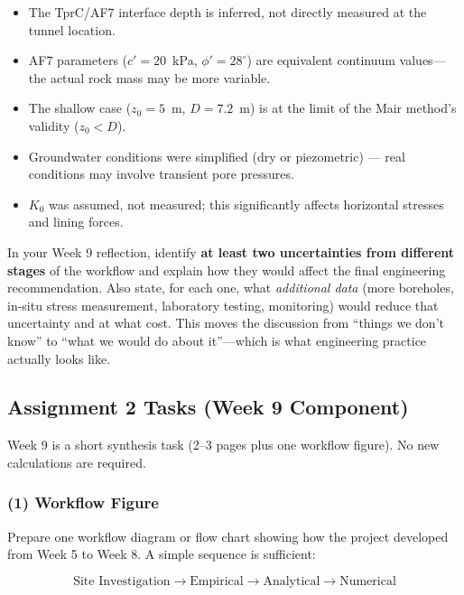 \documentclass[a4paper,12pt]{article}
\begin{document}
\begin{cautionbox}
\begin{itemize}[nosep]
    \item The TprC/AF7 interface depth is inferred, not directly measured at the tunnel location.
    \item AF7 parameters ($c'=20$~kPa, $\phi'=28^\circ$) are equivalent continuum values---the actual rock mass may be more variable.
    \item The shallow case ($z_0=5$~m, $D=7.2$~m) is at the limit of the Mair method's validity ($z_0 < D$).
    \item Groundwater conditions were simplified (dry or piezometric) --- real conditions may involve transient pore pressures.
    \item $K_0$ was assumed, not measured; this significantly affects horizontal stresses and lining forces.
\end{itemize}
\end{cautionbox}

\begin{warnbox}
In your Week 9 reflection, identify \textbf{at least two uncertainties from different stages} of the workflow and explain how they would affect the final engineering recommendation. Also state, for each one, what \textit{additional data} (more boreholes, in-situ stress measurement, laboratory testing, monitoring) would reduce that uncertainty and at what cost. This moves the discussion from ``things we don't know'' to ``what we would do about it''---which is what engineering practice actually looks like.
\end{warnbox}

\subsection{Assignment 2 Tasks (Week 9 Component)}

Week 9 is a short synthesis task (2--3 pages plus one workflow figure). No new calculations are required.

\subsubsection{(1) Workflow Figure}
Prepare one workflow diagram or flow chart showing how the project developed from Week 5 to Week 8. A simple sequence is sufficient:

\[
\boxed{\text{Site Investigation}} \to \boxed{\text{Empirical}} \to \boxed{\text{Analytical}} \to \boxed{\text{Numerical}}
\]
\end{document}
